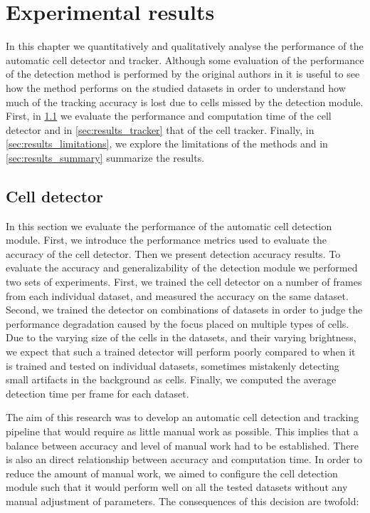 \chapter{Experimental results}
\label{chap:results}

In this chapter we quantitatively and qualitatively analyse the performance of the automatic cell detector and tracker. Although some evaluation of the performance of the detection method is performed by the original authors in \cite{arteta12} it is useful to see how the method performs on the studied datasets in order to understand how much of the tracking accuracy is lost due to cells missed by the detection module. First, in \cref{sec:results_detector} we evaluate the performance and computation time of the cell detector and in \cref{sec:results_tracker} that of the cell tracker. Finally, in \cref{sec:results_limitations}, we explore the limitations of the methods and in \cref{sec:results_summary} summarize the results.

\section{Cell detector}
	\label{sec:results_detector}
	
	In this section we evaluate the performance of the automatic cell detection module. First, we introduce the performance metrics used to evaluate the accuracy of the cell detector. Then we present detection accuracy results. To evaluate the accuracy and generalizability of the detection module we performed two sets of experiments. First, we trained the cell detector on a number of frames from each individual dataset, and measured the accuracy on the same dataset. Second, we trained the detector on combinations of datasets in order to judge the performance degradation caused by the focus placed on multiple types of cells. Due to the varying size of the cells in the datasets, and their varying brightness, we expect that such a trained detector will perform poorly compared to when it is trained and tested on individual datasets, sometimes mistakenly detecting small artifacts in the background as cells. Finally, we computed the average detection time per frame for each dataset.
	
	The aim of this research was to develop an automatic cell detection and tracking pipeline that would require as little manual work as possible. This implies that a balance between accuracy and level of manual work had to be established. There is also an direct relationship between accuracy and computation time. In order to reduce the amount of manual work, we aimed to configure the cell detection module such that it would perform well on all the tested datasets without any manual adjustment of parameters. The consequences of this decision are twofold:
	
